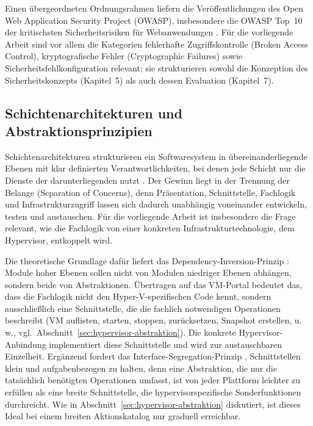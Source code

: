 \documentclass[12pt,a4paper]{article}
\begin{document}
Einen übergeordneten Ordnungsrahmen liefern die Veröffentlichungen des Open Web Application Security Project (OWASP), insbesondere die OWASP Top~10 der kritischsten Sicherheitsrisiken für Webanwendungen \parencite{owasp-top10-2021}. Für die vorliegende Arbeit sind vor allem die Kategorien fehlerhafte Zugriffskontrolle (Broken Access Control), kryptografische Fehler (Cryptographic Failures) sowie Sicherheitsfehlkonfiguration relevant; sie strukturieren sowohl die Konzeption des Sicherheitskonzepts (Kapitel~5) als auch dessen Evaluation (Kapitel~7).

\subsection{Schichtenarchitekturen und Abstraktionsprinzipien}

Schichtenarchitekturen strukturieren ein Softwaresystem in übereinanderliegende Ebenen mit klar definierten Verantwortlichkeiten, bei denen jede Schicht nur die Dienste der darunterliegenden nutzt \parencite{fowler2002patterns}. Der Gewinn liegt in der Trennung der Belange (Separation of Concerns), denn Präsentation, Schnittstelle, Fachlogik und Infrastrukturzugriff lassen sich dadurch unabhängig voneinander entwickeln, testen und austauschen. Für die vorliegende Arbeit ist insbesondere die Frage relevant, wie die Fachlogik von einer konkreten Infrastrukturtechnologie, dem Hypervisor, entkoppelt wird.

Die theoretische Grundlage dafür liefert das Dependency-Inversion-Prinzip \parencite{martin2003agile}: Module hoher Ebenen sollen nicht von Modulen niedriger Ebenen abhängen, sondern beide von Abstraktionen. Übertragen auf das VM-Portal bedeutet das, dass die Fachlogik nicht den Hyper-V-spezifischen Code kennt, sondern ausschließlich eine Schnittstelle, die die fachlich notwendigen Operationen beschreibt (VM auflisten, starten, stoppen, zurücksetzen, Snapshot erstellen, u.\,w., vgl.\ Abschnitt~\ref{sec:hypervisor-abstraktion}). Die konkrete Hypervisor-Anbindung implementiert diese Schnittstelle und wird zur austauschbaren Einzelheit. Ergänzend fordert das Interface-Segregation-Prinzip \parencite{martin2003agile}, Schnittstellen klein und aufgabenbezogen zu halten, denn eine Abstraktion, die nur die tatsächlich benötigten Operationen umfasst, ist von jeder Plattform leichter zu erfüllen als eine breite Schnittstelle, die hypervisorspezifische Sonderfunktionen durchreicht. Wie in Abschnitt~\ref{sec:hypervisor-abstraktion} diskutiert, ist dieses Ideal bei einem breiten Aktionskatalog nur graduell erreichbar.
\end{document}
